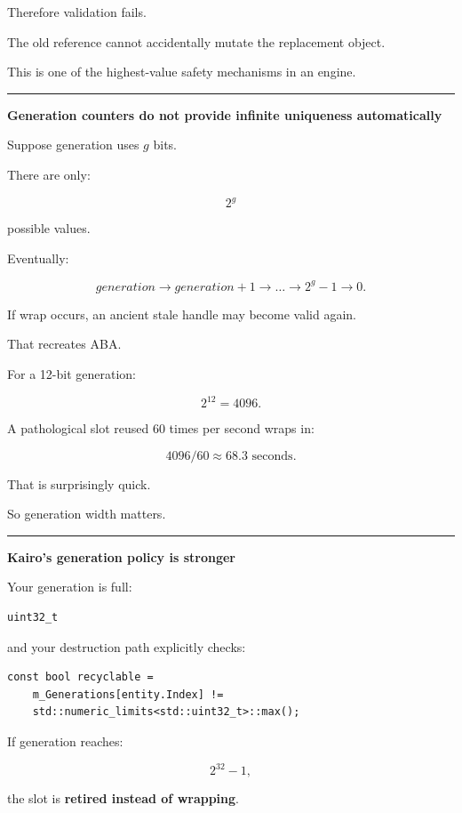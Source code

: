Therefore validation fails.

The old reference cannot accidentally mutate the replacement object.

This is one of the highest-value safety mechanisms in an engine.

\begin{center}\rule{0.5\linewidth}{0.5pt}\end{center}

\textbf{Generation counters do not provide infinite uniqueness automatically}

Suppose generation uses \(g\) bits.

There are only:

\[
2^g
\]

possible values.

Eventually:

\[
generation
\rightarrow
generation+1
\rightarrow
\dots
\rightarrow
2^g-1
\rightarrow
0.
\]

If wrap occurs, an ancient stale handle may become valid again.

That recreates ABA.

For a 12-bit generation:

\[
2^{12}=4096.
\]

A pathological slot reused 60 times per second wraps in:

\[
4096/60
\approx68.3\text{ seconds}.
\]

That is surprisingly quick.

So generation width matters.

\begin{center}\rule{0.5\linewidth}{0.5pt}\end{center}

\textbf{Kairo's generation policy is stronger}

Your generation is full:

\begin{verbatim}
uint32_t
\end{verbatim}

and your destruction path explicitly checks:

\begin{verbatim}
const bool recyclable =
    m_Generations[entity.Index] !=
    std::numeric_limits<std::uint32_t>::max();
\end{verbatim}

If generation reaches:

\[
2^{32}-1,
\]

the slot is \textbf{retired instead of wrapping}.

